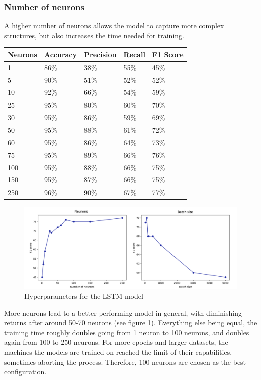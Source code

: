 \documentclass[
a4paper,
pagesize,
pdftex,
12pt,
twoside, %
BCOR=5mm, %
ngerman,
fleqn,
final,
]{scrartcl}
\begin{document}
	\subsubsection{Number of neurons}
	A higher number of neurons allows the model to capture more complex structures, but also increases the time needed for training.
	
	\begin{tabular}{ | p{2cm} || p{2cm}|p{2cm}|p{2cm}|p{2cm}|  }
		\hline
		Neurons & Accuracy & Precision & Recall & F1 Score \\
		\hline
		1 & 86\% & 38\% & 55\% & 45\% \\
		5 & 90\% &  51\% &  52\% &  52\% \\
		10 & 92\% &  66\% &  54\% &  59\% \\
		25 & 95\% &  80\% &  60\% &  70\% \\
		30 & 95\% &  86\% &  59\% &  69\% \\
		50 & 95\% &  88\% &  61\% &  72\% \\
		60 & 95\% &  86\% &  64\% &  73\%\\
		75 & 95\% &  89\% &  66\% &  76\% \\
		100 & 95\% &  88\% &  66\% &  75\% \\
		150 & 95\% &  87\% &  66\% &  75\% \\
		250 & 96\% &  90\% &  67\% &  77\% \\
		\hline
		\hline

	\end{tabular}
			\begin{figure}[h]
		\centering
		\includegraphics[width=1\textwidth]{img/hyper1}
		\caption{Hyperparameters for the LSTM model}
		\label{fig:hyper1}
	\end{figure}

	More neurons lead to a better performing model in general, with diminishing returns after around 50-70 neurons (see figure \ref{fig:hyper1}). Everything else being equal, the training time roughly doubles going from 1 neuron to 100 neurons, and doubles again from 100 to 250 neurons. For more epochs and larger datasets, the machines the models are trained on reached the limit of their capabilities, sometimes aborting the process. Therefore, 100 neurons are chosen as the best configuration.
	
\end{document}
